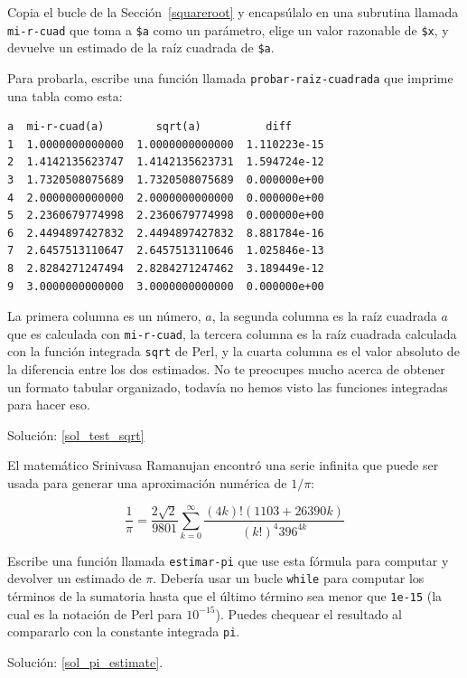 \begin{exercise}
\label{test_sqrt}

Copia el bucle de la Sección~\ref{squareroot} y 
encapsúlalo en una subrutina llamada \verb|mi-r-cuad|
que toma a {\tt \$a} como un parámetro, elige un valor 
razonable de {\tt \$x}, y devuelve un estimado de la 
raíz cuadrada de {\tt \$a}.

Para probarla, escribe una función llamada \verb|probar-raiz-cuadrada|
que imprime una tabla como esta:

\begin{lstlisting}
a  mi-r-cuad(a)        sqrt(a)          diff
1  1.0000000000000  1.0000000000000  1.110223e-15
2  1.4142135623747  1.4142135623731  1.594724e-12
3  1.7320508075689  1.7320508075689  0.000000e+00
4  2.0000000000000  2.0000000000000  0.000000e+00
5  2.2360679774998  2.2360679774998  0.000000e+00
6  2.4494897427832  2.4494897427832  8.881784e-16
7  2.6457513110647  2.6457513110646  1.025846e-13
8  2.8284271247494  2.8284271247462  3.189449e-12
9  3.0000000000000  3.0000000000000  0.000000e+00

\end{lstlisting}
%
La primera columna es un número, $a$, la segunda columna
es la raíz cuadrada $a$ que es calculada con \verb|mi-r-cuad|,
la tercera columna es la raíz cuadrada calculada con la 
función integrada {\tt sqrt} de Perl, y la cuarta columna
es el valor absoluto de la diferencia entre los dos
estimados. No te preocupes mucho acerca de obtener un formato 
tabular organizado, todavía no hemos visto las funciones
integradas para hacer eso.

Solución: \ref{sol_test_sqrt}
%

\end{exercise}



\begin{exercise}
\label{pi_estimate}

El matemático Srinivasa Ramanujan encontró una serie infinita
que puede ser usada para generar una aproximación numérica
de $1 / \pi$:

\[ \frac{1}{\pi} = \frac{2\sqrt{2}}{9801} 
\sum^\infty_{k=0} \frac{(4k)!(1103+26390k)}{(k!)^4 396^{4k}} \]

Escribe una función llamada \verb|estimar-pi| que use 
esta fórmula para computar y devolver un estimado de $\pi$.
Debería usar un bucle {\tt while} para computar los términos
de la sumatoria hasta que el último término sea menor que 
{\tt 1e-15}  (la cual es la notación de Perl para $10^{-15}$).
Puedes chequear el resultado al compararlo con la constante
integrada {\tt pi}.

Solución: \ref{sol_pi_estimate}.

\end{exercise}

